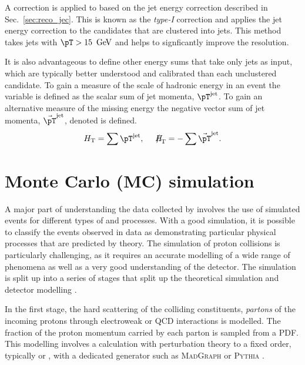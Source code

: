 A correction is applied to \met based on the jet energy correction
described in Sec.~\ref{sec:reco_jec}. This is known as the \emph{type-I}
correction and applies the jet energy correction to the \PF candidates that are
clustered into jets. This method takes jets with $\pT>15~\gev$ and
helps to signficantly improve the \met resolution.

It is also advantageous to define other energy sums that take only
jets as input, which are typically better understood and calibrated
than each unclustered \PF candidate. To gain a measure of the scale of
hadronic energy in an event the \HT variable is defined as the scalar
sum of jet momenta, $\pT^{\textrm{jet}}$. To gain an alternative
measure of the missing energy the negative vector sum of jet momenta,
$\vec{\pT}^{\textrm{jet}}$, denoted  \MHT is defined.
\begin{equation}
\HT = \sum{\pT^{\textrm{jet}}},~~~~\MHT =
-\sum{\vec{\pT}^{\textrm{jet}}}.
\end{equation}

\section{Monte Carlo (MC) simulation}
\label{sec:mc_reco}

A major part of understanding the data collected by \CMS involves the
use of simulated events for different types of \SM and \BSM processes.
With a good simulation, it is possible to classify the events observed
in data as demonstrating particular physical processes that are
predicted by theory. The simulation of proton collisions is
particularly challenging, as it requires an accurate modelling of a
wide range of \SM phenomena as well as a very good understanding of
the \CMS detector. The simulation is split up into a series of
stages that split up the theoretical simulation and detector modelling
\cite{Buckley:2011ms}. 

In the first stage, the hard scattering of the colliding constituents,
\emph{partons} of the incoming protons through electroweak or QCD
interactions is modelled. The fraction of the proton momentum carried
by each parton is sampled from a \ac{PDF}.  This modelling involves a
calculation with perturbation theory to a fixed order, typically \LO
or \NLO, with a dedicated \MC generator such as \textsc{MadGraph}
\cite{Alwall:2011uj} or \textsc{Pythia} \cite{Sjostrand:2007gs}.

